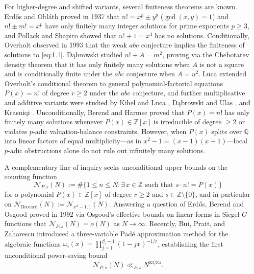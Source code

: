 \documentclass[11pt,reqno]{amsart}
\theoremstyle{remark}
\numberwithin{equation}{section}
\newcommand{\Z}{\mathbb{Z}}
\newcommand{\Q}{\mathbb{Q}}
\begin{document}
For higher-degree and shifted variants, several finiteness theorems are known. Erd\H{o}s and Obl\'ath \cite{ErdosOblath1937} proved in 1937 that $n! = x^p \pm y^p$ ($\gcd(x, y) = 1$) and $n! \pm m! = x^p$ have only finitely many integer solutions for prime exponents $p \ge 3$, and Pollack and Shapiro \cite{PollackShapiro1973} showed that $n! + 1 = x^4$ has no solutions. Conditionally, Overholt \cite{Overholt1993} observed in 1993 that the weak $abc$ conjecture implies the finiteness of solutions to \eqref{eq:1.1}. D\k{a}browski \cite{Dabrowski1996} studied $n! + A = m^2$, proving via the Chebotarev density theorem that it has only finitely many solutions when $A$ is not a square and is conditionally finite under the $abc$ conjecture when $A = u^2$. Luca \cite{Luca2002} extended Overholt's conditional theorem to general polynomial-factorial equations $P(x) = n!$ of degree $r \ge 2$ under the $abc$ conjecture, and further multiplicative and additive variants were studied by Kihel and Luca \cite{KihelLuca2008}, D\k{a}browski and Ulas \cite{DabrowskiUlas2013}, and Krasniqi \cite{Krasniqi2026}. Unconditionally, Berend and Harmse \cite{BerendHarmse2006} proved that $P(x) = n!$ has only finitely many solutions whenever $P(x) \in \Z[x]$ is irreducible of degree $\ge 2$ or violates $p$-adic valuation-balance constraints. However, when $P(x)$ splits over $\Q$ into linear factors of equal multiplicity---as in $x^2 - 1 = (x - 1)(x + 1)$---local $p$-adic obstructions alone do not rule out infinitely many solutions.

A complementary line of inquiry seeks unconditional upper bounds on the counting function
\begin{equation}\label{eq:1.2}
\mathcal{N}_{P,s}(N) := \#\bigl\{1 \le n \le N : \exists\, x \in \Z \text{ such that } s \cdot n! = P(x)\bigr\}
\end{equation}
for a polynomial $P(x) \in \Z[x]$ of degree $r \ge 2$ and $s \in \Z \setminus \{0\}$, and in particular on $\mathcal{N}_{\mathrm{Brocard}}(N) := \mathcal{N}_{x^2-1,1}(N)$. Answering a question of Erd\H{o}s, Berend and Osgood \cite{BerendOsgood1992} proved in 1992 via Osgood's effective bounds on linear forms in Siegel $G$-functions that $\mathcal{N}_{P,s}(N) = o(N)$ as $N \to \infty$. Recently, Bui, Pratt, and Zaharescu \cite{BuiPrattZaharescu2023} introduced a three-variable Pad\'e approximation method for the algebraic functions $\omega_i(x) = \prod_{j=1}^{\beta_i-1} (1 - jx)^{-1/r}$, establishing the first unconditional power-saving bound
\begin{equation}\label{eq:1.3}
\mathcal{N}_{P,s}(N) \ll_{P,s} N^{33/34}.
\end{equation}
\end{document}

